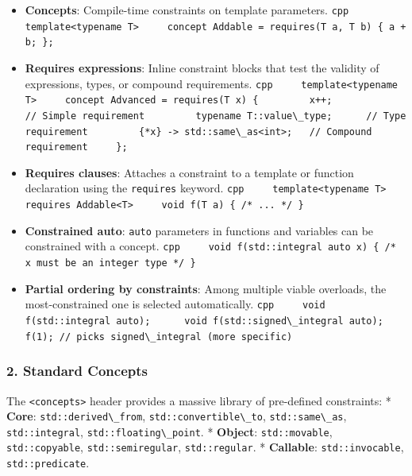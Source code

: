 \begin{itemize}
\tightlist
\item
  \textbf{Concepts}: Compile-time constraints on template parameters.
  \passthrough{\lstinline!cpp     template<typename T>     concept Addable = requires(T a, T b) \{ a + b; \};!}
\item
  \textbf{Requires expressions}: Inline constraint blocks that test the
  validity of expressions, types, or compound requirements.
  \passthrough{\lstinline!cpp     template<typename T>     concept Advanced = requires(T x) \{         x++;                        // Simple requirement         typename T::value\_type;      // Type requirement         \{*x\} -> std::same\_as<int>;   // Compound requirement     \};!}
\item
  \textbf{Requires clauses}: Attaches a constraint to a template or
  function declaration using the \passthrough{\lstinline!requires!}
  keyword.
  \passthrough{\lstinline!cpp     template<typename T>     requires Addable<T>     void f(T a) \{ /* ... */ \}!}
\item
  \textbf{Constrained auto}: \passthrough{\lstinline!auto!} parameters
  in functions and variables can be constrained with a concept.
  \passthrough{\lstinline!cpp     void f(std::integral auto x) \{ /* x must be an integer type */ \}!}
\item
  \textbf{Partial ordering by constraints}: Among multiple viable
  overloads, the most-constrained one is selected automatically.
  \passthrough{\lstinline!cpp     void f(std::integral auto);      void f(std::signed\_integral auto);      f(1); // picks signed\_integral (more specific)!}
\end{itemize}

\hypertarget{standard-concepts}{%
\subsubsection{2. Standard Concepts}\label{standard-concepts}}

The \passthrough{\lstinline!<concepts>!} header provides a massive
library of pre-defined constraints: * \textbf{Core}:
\passthrough{\lstinline!std::derived\_from!},
\passthrough{\lstinline!std::convertible\_to!},
\passthrough{\lstinline!std::same\_as!},
\passthrough{\lstinline!std::integral!},
\passthrough{\lstinline!std::floating\_point!}. * \textbf{Object}:
\passthrough{\lstinline!std::movable!},
\passthrough{\lstinline!std::copyable!},
\passthrough{\lstinline!std::semiregular!},
\passthrough{\lstinline!std::regular!}. * \textbf{Callable}:
\passthrough{\lstinline!std::invocable!},
\passthrough{\lstinline!std::predicate!}.

